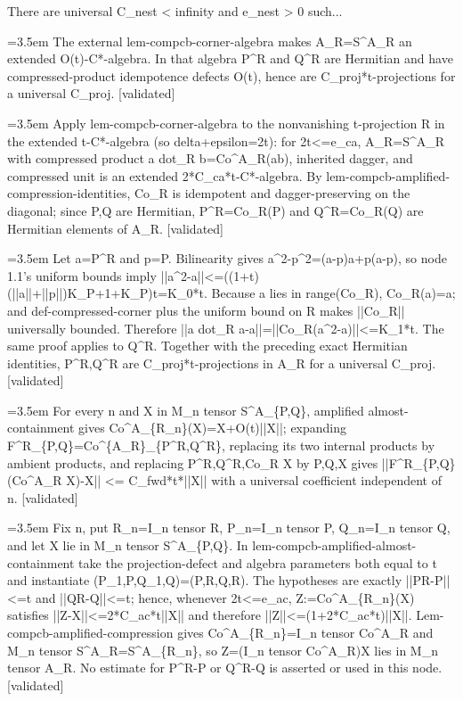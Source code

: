 \documentclass{article}
\newcommand{\step}[1]{\par\noindent\hangindent=3.5em\hangafter=1%
  \makebox[3.5em][l]{\textbf{#1.}}}
\newcommand{\steptag}[1]{\hfill{\small\textsf{[#1]}}}
\begin{document}
\begin{proofbox}{There are universal C\_nest < infinity and e\_nest > 0 such...}
\step{1.2} The external lem-compcb-corner-algebra makes A\_R=S\textasciicircum{}A\_R an extended O(t)-C*-algebra. In that algebra P\textasciicircum{}R and Q\textasciicircum{}R are Hermitian and have compressed-product idempotence defects O(t), hence are C\_proj*t-projections for a universal C\_proj. \steptag{validated} \\[6pt]
\step{1.2.1} Apply lem-compcb-corner-algebra to the nonvanishing t-projection R in the extended t-C*-algebra (so delta+epsilon=2t): for 2t<=e\_ca, A\_R=S\textasciicircum{}A\_R with compressed product a dot\_R b=Co\textasciicircum{}A\_R(ab), inherited dagger, and compressed unit is an extended 2*C\_ca*t-C*-algebra. By lem-compcb-amplified-compression-identities, Co\_R is idempotent and dagger-preserving on the diagonal; since P,Q are Hermitian, P\textasciicircum{}R=Co\_R(P) and Q\textasciicircum{}R=Co\_R(Q) are Hermitian elements of A\_R. \steptag{validated} \\[4pt]
\step{1.2.2} Let a=P\textasciicircum{}R and p=P. Bilinearity gives a\textasciicircum{}2-p\textasciicircum{}2=(a-p)a+p(a-p), so node 1.1's uniform bounds imply ||a\textasciicircum{}2-a||<=((1+t)(||a||+||p||)K\_P+1+K\_P)t=K\_0*t. Because a lies in range(Co\_R), Co\_R(a)=a; and def-compressed-corner plus the uniform bound on R makes ||Co\_R|| universally bounded. Therefore ||a dot\_R a-a||=||Co\_R(a\textasciicircum{}2-a)||<=K\_1*t. The same proof applies to Q\textasciicircum{}R. Together with the preceding exact Hermitian identities, P\textasciicircum{}R,Q\textasciicircum{}R are C\_proj*t-projections in A\_R for a universal C\_proj. \steptag{validated} \\[4pt]
\step{1.3} For every n and X in M\_n tensor S\textasciicircum{}A\_\{P,Q\}, amplified almost-containment gives Co\textasciicircum{}A\_\{R\_n\}(X)=X+O(t)||X||; expanding F\textasciicircum{}R\_\{P,Q\}=Co\textasciicircum{}\{A\_R\}\_\{P\textasciicircum{}R,Q\textasciicircum{}R\}, replacing its two internal products by ambient products, and replacing P\textasciicircum{}R,Q\textasciicircum{}R,Co\_R X by P,Q,X gives ||F\textasciicircum{}R\_\{P,Q\}(Co\textasciicircum{}A\_R X)-X|| <= C\_fwd*t*||X|| with a universal coefficient independent of n. \steptag{validated} \\[6pt]
\step{1.3.1} Fix n, put R\_n=I\_n tensor R, P\_n=I\_n tensor P, Q\_n=I\_n tensor Q, and let X lie in M\_n tensor S\textasciicircum{}A\_\{P,Q\}. In lem-compcb-amplified-almost-containment take the projection-defect and algebra parameters both equal to t and instantiate (P\_1,P,Q\_1,Q)=(P,R,Q,R). The hypotheses are exactly ||PR-P||<=t and ||QR-Q||<=t; hence, whenever 2t<=e\_ac, Z:=Co\textasciicircum{}A\_\{R\_n\}(X) satisfies ||Z-X||<=2*C\_ac*t||X|| and therefore ||Z||<=(1+2*C\_ac*t)||X||. Lem-compcb-amplified-compression gives Co\textasciicircum{}A\_\{R\_n\}=I\_n tensor Co\textasciicircum{}A\_R and M\_n tensor S\textasciicircum{}A\_R=S\textasciicircum{}A\_\{R\_n\}, so Z=(I\_n tensor Co\textasciicircum{}A\_R)X lies in M\_n tensor A\_R. No estimate for P\textasciicircum{}R-P or Q\textasciicircum{}R-Q is asserted or used in this node. \steptag{validated} \\[4pt]

\end{proofbox}
\end{document}
